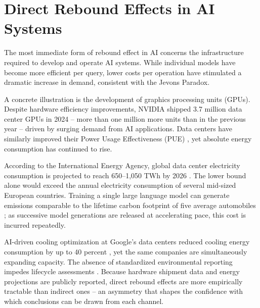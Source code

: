 \section{Direct Rebound Effects in AI Systems}
\label{sec:direct}

The most immediate form of rebound effect in AI concerns the
infrastructure required to develop and operate AI systems. While
individual models have become more efficient per query, lower
costs per operation have stimulated a dramatic increase in
demand, consistent with the Jevons Paradox.

A concrete illustration is the development of graphics processing
units (GPUs). Despite hardware efficiency improvements, NVIDIA
shipped 3.7 million data center GPUs in 2024 \cite{luccioni2025}
-- more than one million more units than in the previous year
-- driven by surging demand from AI applications. Data centers
have similarly improved their Power Usage Effectiveness (PUE)
\cite{luccioni2025}, yet absolute energy consumption has
continued to rise.

According to the International Energy Agency, global data center
electricity consumption is projected to reach 650--1,050 TWh
by 2026 \cite{iea2025ai}. The lower bound alone would exceed
the annual electricity consumption of several mid-sized European
countries. Training a single large language model can generate
emissions comparable to the lifetime carbon footprint of five
average automobiles \cite{luccioni2025}; as successive model
generations are released at accelerating pace, this cost is
incurred repeatedly.

AI-driven cooling optimization at Google's data centers reduced
cooling energy consumption by up to 40 percent \cite{mhlanga2025}, yet
the same companies are simultaneously expanding capacity. The
absence of standardized environmental reporting impedes
lifecycle assessments \cite{luccioni2025}. Because hardware
shipment data and energy projections are publicly reported,
direct rebound effects are more empirically tractable than
indirect ones -- an asymmetry that shapes the confidence with
which conclusions can be drawn from each channel.
